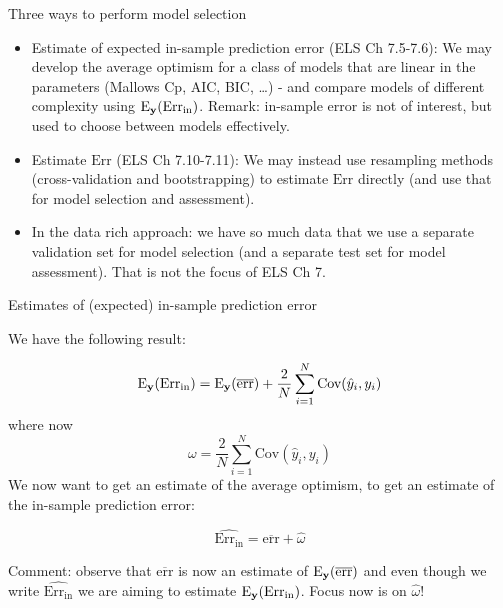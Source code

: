 \documentclass[
  ignorenonframetext,
]{beamer}
\begin{document}
\begin{frame}

\begin{block}{Three ways to perform model selection}

\begin{itemize}
\item
  Estimate of expected in-sample prediction error (ELS Ch 7.5-7.6): We
  may develop the average optimism for a class of models that are linear
  in the parameters (Mallows Cp, AIC, BIC, \ldots) - and compare models
  of different complexity using
  \(\text{E}_{\bf y}(\text{Err}_{\text{in}})\). Remark: in-sample error
  is not of interest, but used to choose between models effectively.
\item
  Estimate \(\text{Err}\) (ELS Ch 7.10-7.11): We may instead use
  resampling methods (cross-validation and bootstrapping) to estimate
  \(\text{Err}\) directly (and use that for model selection and
  assessment).
\item
  In the data rich approach: we have so much data that we use a separate
  validation set for model selection (and a separate test set for model
  assessment). That is not the focus of ELS Ch 7.
\end{itemize}

\end{block}

\end{frame}

\begin{frame}

\begin{block}{Estimates of (expected) in-sample prediction error}

We have the following result:

\[ \text{E}_{\bf y}(\text{Err}_{\text{in}})=\text{E}_{\bf y}(\overline{\text{err}})+\frac{2}{N} \sum_{i=1}^N \text{Cov}(\hat{y}_i,y_i)\]
where now \[ \omega=\frac{2}{N} \sum_{i=1}^N \text{Cov}(\hat{y}_i,y_i)\]
We now want to get an estimate of the average optimism, to get an
estimate of the in-sample prediction error:

\[ \widehat{\text{Err}_{\text{in}}}=\overline{\text{err}}+\hat{\omega}\]

Comment: observe that \(\overline{\text{err}}\) is now an estimate of
\(\text{E}_{\bf y}(\overline{\text{err}})\) and even though we write
\(\widehat{\text{Err}_{\text{in}}}\) we are aiming to estimate
\(\text{E}_{\bf y}(\text{Err}_{\text{in}})\). Focus now is on
\(\hat{\omega}\)!

\end{block}

\end{frame}
\end{document}
